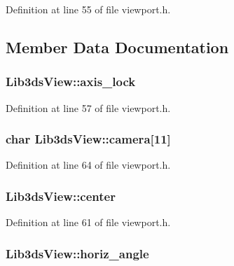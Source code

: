Definition at line 55 of file viewport.\-h.



\subsection{Member Data Documentation}
\hypertarget{struct_lib3ds_view_ab112afa8d63e727a18c885c7c6e4d2b9}{
\subsubsection[{axis\-\_\-lock}]{ Lib3ds\-View\-::axis\-\_\-lock}}\label{struct_lib3ds_view_ab112afa8d63e727a18c885c7c6e4d2b9}


Definition at line 57 of file viewport.\-h.

\hypertarget{struct_lib3ds_view_a83cb527239c451b98783e712f39ce402}{
\subsubsection[{camera}]{\setlength{\rightskip}{0pt plus 5cm}char Lib3ds\-View\-::camera\mbox{[}11\mbox{]}}}\label{struct_lib3ds_view_a83cb527239c451b98783e712f39ce402}


Definition at line 64 of file viewport.\-h.

\hypertarget{struct_lib3ds_view_a7309cd9fb012c5547892590485484b3c}{
\subsubsection[{center}]{ Lib3ds\-View\-::center}}\label{struct_lib3ds_view_a7309cd9fb012c5547892590485484b3c}


Definition at line 61 of file viewport.\-h.

\hypertarget{struct_lib3ds_view_a1161d557160ea7220b9557ce1eb61b3c}{
\subsubsection[{horiz\-\_\-angle}]{ Lib3ds\-View\-::horiz\-\_\-angle}}\label{struct_lib3ds_view_a1161d557160ea7220b9557ce1eb61b3c}


